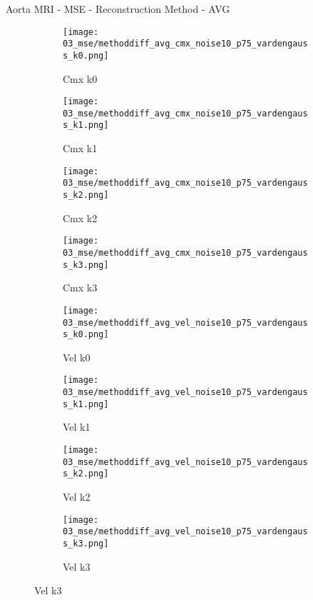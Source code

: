 \documentclass{beamer}
\begin{document}
\begin{frame}{Aorta MRI - MSE - Reconstruction Method - AVG}{}
\begin{figure}
\begin{subfigure}{0.24\textwidth}
\texttt{[image: 03\_mse/methoddiff\_avg\_cmx\_noise10\_p75\_vardengauss\_k0.png]}
\vspace{-20pt}
\caption*{\tiny Cmx k0}
\end{subfigure}
\begin{subfigure}{0.24\textwidth}
\texttt{[image: 03\_mse/methoddiff\_avg\_cmx\_noise10\_p75\_vardengauss\_k1.png]}
\vspace{-20pt}
\caption*{\tiny Cmx k1}
\end{subfigure}
\begin{subfigure}{0.24\textwidth}
\texttt{[image: 03\_mse/methoddiff\_avg\_cmx\_noise10\_p75\_vardengauss\_k2.png]}
\vspace{-20pt}
\caption*{\tiny Cmx k2}
\end{subfigure}
\begin{subfigure}{0.24\textwidth}
\texttt{[image: 03\_mse/methoddiff\_avg\_cmx\_noise10\_p75\_vardengauss\_k3.png]}
\vspace{-20pt}
\caption*{\tiny Cmx k3}
\end{subfigure}

\begin{subfigure}{0.24\textwidth}
\texttt{[image: 03\_mse/methoddiff\_avg\_vel\_noise10\_p75\_vardengauss\_k0.png]}
\vspace{-20pt}
\caption*{\tiny Vel k0}
\end{subfigure}
\begin{subfigure}{0.24\textwidth}
\texttt{[image: 03\_mse/methoddiff\_avg\_vel\_noise10\_p75\_vardengauss\_k1.png]}
\vspace{-20pt}
\caption*{\tiny Vel k1}
\end{subfigure}
\begin{subfigure}{0.24\textwidth}
\texttt{[image: 03\_mse/methoddiff\_avg\_vel\_noise10\_p75\_vardengauss\_k2.png]}
\vspace{-20pt}
\caption*{\tiny Vel k2}
\end{subfigure}
\begin{subfigure}{0.24\textwidth}
\texttt{[image: 03\_mse/methoddiff\_avg\_vel\_noise10\_p75\_vardengauss\_k3.png]}
\vspace{-20pt}
\caption*{\tiny Vel k3}
\end{subfigure}
\end{figure}
\end{frame}
\end{document}

